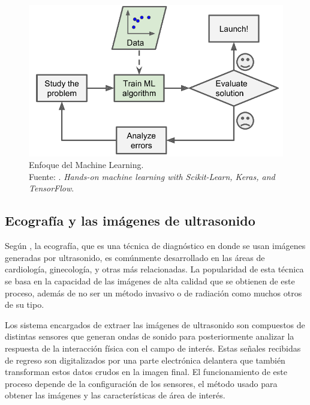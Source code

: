 \begin{figure}[H]
	\begin{center}
		\includegraphics[width=1.00\textwidth]{2/figures/enfoque_ml.png}
		\caption[Enfoque del Machine Learning]{Enfoque del Machine Learning. \\
		Fuente: \cite{bk_geron2022handml}. \textit{Hands-on machine learning with Scikit-Learn, Keras, and TensorFlow}.}
		\label{2:fig209}
	\end{center}
\end{figure}

\subsection{Ecografía y las imágenes de ultrasonido}
Según \cite{pr_herrera2017diseimp}, la ecografía, que es una técnica de diagnóstico en donde se usan imágenes generadas por ultrasonido, es comúnmente desarrollado en las áreas de cardiología, ginecología, y otras más relacionadas. La popularidad de esta técnica se basa en la capacidad de las imágenes de alta calidad que se obtienen de este proceso, además de no ser un método invasivo o de radiación como muchos otros de su tipo.

Los sistema encargados de extraer las imágenes de ultrasonido son compuestos de distintas sensores que generan ondas de sonido para posteriormente analizar la respuesta de la interacción física con el campo de interés. Estas señales recibidas de regreso son digitalizados por una parte electrónica delantera que también transforman estos datos crudos en la imagen final. El funcionamiento de este proceso depende de la configuración de los sensores, el método usado para obtener las imágenes y las características de área de interés. \parencite{pr_camacho2022ultrasonicimg}

